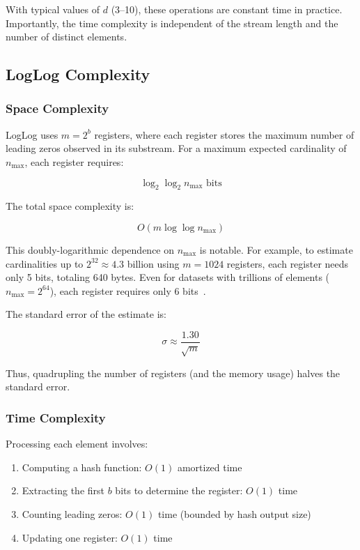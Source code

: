 With typical values of $d$ (3--10), these operations are constant time in practice. Importantly, the time complexity is independent of the stream length and the number of distinct elements.

\subsection{LogLog Complexity}

\subsubsection{Space Complexity}

LogLog uses $m = 2^b$ registers, where each register stores the maximum number of leading zeros observed in its substream. For a maximum expected cardinality of $n_{\max}$, each register requires:

\begin{equation}
\log_2 \log_2 n_{\max} \text{ bits}
\end{equation}

The total space complexity is:

\begin{equation}
O(m \log \log n_{\max})
\end{equation}

This doubly-logarithmic dependence on $n_{\max}$ is notable. For example, to estimate cardinalities up to $2^{32} \approx 4.3$ billion using $m = 1024$ registers, each register needs only 5 bits, totaling 640 bytes. Even for datasets with trillions of elements ($n_{\max} = 2^{64}$), each register requires only 6 bits~\cite{durand2003loglog}.

The standard error of the estimate is:

\begin{equation}
\sigma \approx \frac{1.30}{\sqrt{m}}
\end{equation}

Thus, quadrupling the number of registers (and the memory usage) halves the standard error.

\subsubsection{Time Complexity}

Processing each element involves:
\begin{enumerate}
    \item Computing a hash function: $O(1)$ amortized time
    \item Extracting the first $b$ bits to determine the register: $O(1)$ time
    \item Counting leading zeros: $O(1)$ time (bounded by hash output size)
    \item Updating one register: $O(1)$ time
\end{enumerate}

